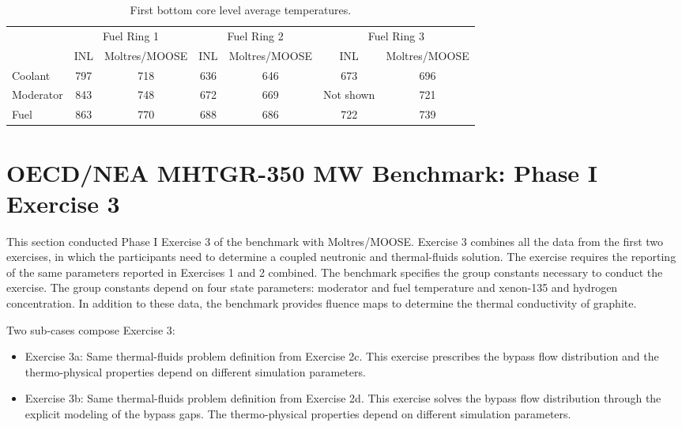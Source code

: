 \begin{table}[htbp!]
\centering
      \caption{First bottom core level average temperatures.}
      \label{tab:th-ex2a-results}
\begin{tabular}{l|c|c|c|c|c|c}
    \toprule
          & \multicolumn{2}{c|}{Fuel Ring 1} & \multicolumn{2}{c|}{Fuel Ring 2} & \multicolumn{2}{c}{Fuel Ring 3} \\ \cline{2-7} 
          & INL     & Moltres/MOOSE     & INL     & Moltres/MOOSE     & INL       & Moltres/MOOSE \\
    \midrule
Coolant   & 797     & 718               & 636     & 646               & 673       & 696           \\
Moderator & 843     & 748               & 672     & 669               & Not shown & 721           \\
Fuel      & 863     & 770               & 688     & 686               & 722       & 739           \\
    \bottomrule
  \end{tabular}
\end{table}

\section{OECD/NEA MHTGR-350 MW Benchmark: Phase I Exercise 3}
\label{sec:ph1ex3}

This section conducted Phase I Exercise 3 of the benchmark with Moltres/MOOSE.
Exercise 3 combines all the data from the first two exercises, in which the participants need to determine a coupled neutronic and thermal-fluids solution.
The exercise requires the reporting of the same parameters reported in Exercises 1 and 2 combined.
The benchmark specifies the group constants necessary to conduct the exercise.
The group constants depend on four state parameters: moderator and fuel temperature and xenon-135 and hydrogen concentration.
In addition to these data, the benchmark provides fluence maps to determine the thermal conductivity of graphite.

Two sub-cases compose Exercise 3:
\begin{itemize}
  \item Exercise 3a: Same thermal-fluids problem definition from Exercise 2c. This exercise prescribes the bypass flow distribution and the thermo-physical properties depend on different simulation parameters.
  \item Exercise 3b: Same thermal-fluids problem definition from Exercise 2d. This exercise solves the bypass flow distribution through the explicit modeling of the bypass gaps. The thermo-physical properties depend on different simulation parameters.
\end{itemize}

